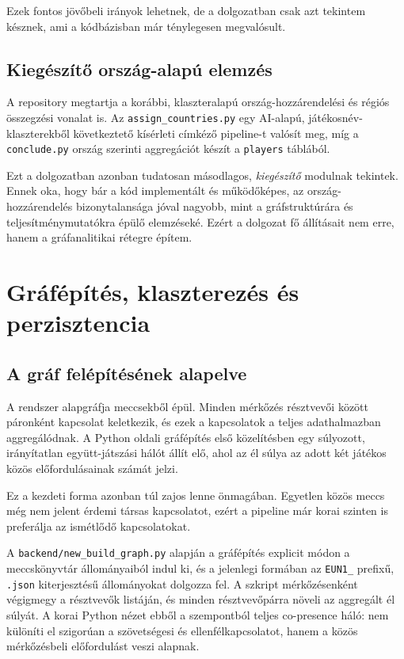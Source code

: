 \documentclass[a4paper,12pt]{report}
\begin{document}
Ezek fontos jövőbeli irányok lehetnek, de a dolgozatban csak azt tekintem késznek, ami a kódbázisban már ténylegesen megvalósult.

\section{Kiegészítő ország-alapú elemzés}

A repository megtartja a korábbi, klaszteralapú ország-hozzárendelési és régiós összegzési vonalat is. Az \texttt{assign\_countries.py} egy AI-alapú, játékosnév-klaszterekből következtető kísérleti címkéző pipeline-t valósít meg, míg a \texttt{conclude.py} ország szerinti aggregációt készít a \texttt{players} táblából.

Ezt a dolgozatban azonban tudatosan másodlagos, \emph{kiegészítő} modulnak tekintek. Ennek oka, hogy bár a kód implementált és működőképes, az ország-hozzárendelés bizonytalansága jóval nagyobb, mint a gráfstruktúrára és teljesítménymutatókra épülő elemzéseké. Ezért a dolgozat fő állításait nem erre, hanem a gráfanalitikai rétegre építem.

\chapter{Gráfépítés, klaszterezés és perzisztencia}

\section{A gráf felépítésének alapelve}

A rendszer alapgráfja meccsekből épül. Minden mérkőzés résztvevői között páronként kapcsolat keletkezik, és ezek a kapcsolatok a teljes adathalmazban aggregálódnak. A Python oldali gráfépítés első közelítésben egy súlyozott, irányítatlan együtt-játszási hálót állít elő, ahol az él súlya az adott két játékos közös előfordulásainak számát jelzi.

Ez a kezdeti forma azonban túl zajos lenne önmagában. Egyetlen közös meccs még nem jelent érdemi társas kapcsolatot, ezért a pipeline már korai szinten is preferálja az ismétlődő kapcsolatokat.

A \texttt{backend/new\_build\_graph.py} alapján a gráfépítés explicit módon a meccskönyvtár állományaiból indul ki, és a jelenlegi formában az \texttt{EUN1\_} prefixű, \texttt{.json} kiterjesztésű állományokat dolgozza fel. A szkript mérkőzésenként végigmegy a résztvevők listáján, és minden résztvevőpárra növeli az aggregált él súlyát. A korai Python nézet ebből a szempontból teljes co-presence háló: nem különíti el szigorúan a szövetségesi és ellenfélkapcsolatot, hanem a közös mérkőzésbeli előfordulást veszi alapnak.
\end{document}
